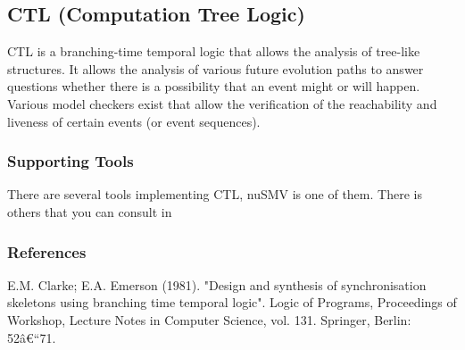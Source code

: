 
\subsection{CTL (Computation Tree Logic)}
\label{subsecL:CTL}

\author{Stefan}

CTL is a branching-time temporal logic that allows the analysis of tree-like structures.
It allows the analysis of various future evolution paths to answer questions whether there is a possibility that an event might or will happen.
Various model checkers exist that allow the verification of the reachability and liveness of certain events (or event sequences).





\subsubsection{Supporting Tools}

There are several tools implementing CTL, nuSMV is one of them. There is others that you can consult in \cite{modelcheckingcontest}


\subsubsection{References}
E.M. Clarke; E.A. Emerson (1981). "Design and synthesis of synchronisation skeletons using branching time temporal logic". Logic of Programs, Proceedings of Workshop, Lecture Notes in Computer Science, vol. 131. Springer, Berlin: 52â€“71.


